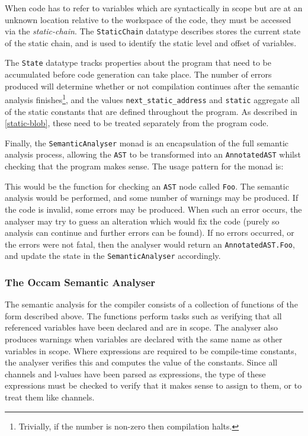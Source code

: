 When code has to refer to variables which are syntactically in scope but are at
an unknown location relative to the workspace of the code, they must be accessed
via the \textit{\gls{static-chain}}. The \texttt{StaticChain} datatype describes
stores the current state of the static chain, and is used to identify the static
level and offset of variables.

The \texttt{State} datatype tracks properties about the program that need to be
accumulated before code generation can take place. The number of errors produced
will determine whether or not compilation continues after the semantic analysis
finishes\footnote{Trivially, if the number is non-zero then compilation halts.},
and the values \texttt{next\_static\_address} and \texttt{static} aggregate all
of the static constants that are defined throughout the program.  As described
in \ref{static-blob}, these need to be treated separately from the program code.

Finally, the \texttt{SemanticAnalyser} monad is an encapsulation of the full
semantic analysis process, allowing the \texttt{AST} to be transformed into an
\texttt{AnnotatedAST} whilst checking that the program makes sense. The usage
pattern for the monad is:

This would be the function for checking an \texttt{AST} node called
\texttt{Foo}. The semantic analysis would be performed, and some number of
warnings may be produced. If the code is invalid, some errors may be produced.
When such an error occurs, the analyser may try to guess an alteration which
would fix the code (purely so analysis can continue and further errors can be
found). If no errors occurred, or the errors were not fatal, then the analyser
would return an \texttt{AnnotatedAST.Foo}, and update the state in the
\texttt{SemanticAnalyser} accordingly.

\subsubsection{The Occam Semantic Analyser}

The semantic analysis for the compiler consists of a collection of functions of
the form described above. The functions perform tasks such as verifying that all
referenced variables have been declared and are in scope. The analyser also
produces warnings when variables are declared with the same name as other
variables in scope. Where expressions are required to be compile-time constants,
the analyser verifies this and computes the value of the constants. Since all
channels and \gls{l-value}s have been parsed as expressions, the type of these
expressions must be checked to verify that it makes sense to assign to them, or
to treat them like channels.

